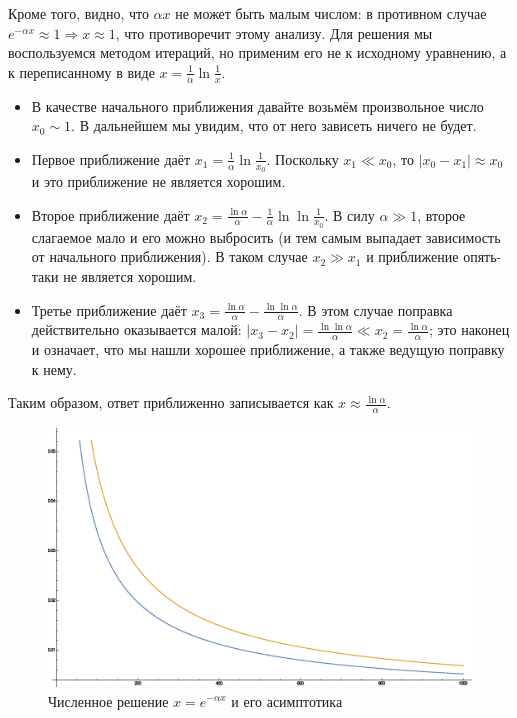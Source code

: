 \documentclass[a4paper,12pt]{article}
\begin{document}
\noindent
Кроме того, видно,
что $\alpha x$ не может быть малым числом: в противном случае $e^{-\alpha x}\approx1\Rightarrow x\approx1$,
что противоречит этому анализу. Для решения мы воспользуемся методом
итераций, но применим его не к исходному уравнению, а к переписанному
в виде $x=\frac{1}{\alpha}\ln\frac{1}{x}$. 
\begin{itemize}
	\item В качестве начального приближения давайте возьмём произвольное число
	$x_{0}\sim1$. В дальнейшем мы увидим, что от него зависеть ничего
	не будет.
	\item Первое приближение даёт $x_{1}=\frac{1}{\alpha}\ln\frac{1}{x_{0}}$.
	Поскольку $x_{1}\ll x_{0}$, то $\left|x_{0}-x_{1}\right|\approx x_{0}$
	и это приближение не является хорошим.
	\item Второе приближение даёт $x_{2}=\frac{\ln\alpha}{\alpha}-\frac{1}{\alpha}\ln\ln\frac{1}{x_{0}}$.
	В силу $\alpha\gg1$, второе слагаемое мало и его можно выбросить
	(и тем самым выпадает зависимость от начального приближения). В таком
	случае $x_{2}\gg x_{1}$ и приближение опять-таки не является хорошим.
	\item Третье приближение даёт $x_{3}=\frac{\ln\alpha}{\alpha}-\frac{\ln\ln\alpha}{\alpha}$.
	В этом случае поправка действительно оказывается малой: $\left|x_{3}-x_{2}\right|=\frac{\ln\ln\alpha}{\alpha}\ll x_{2}=\frac{\ln\alpha}{\alpha}$;
	это наконец и означает, что мы нашли хорошее приближение, а также
	ведущую поправку к нему.
\end{itemize}
Таким образом, ответ приближенно записывается как $x\approx\frac{\ln\alpha}{\alpha}$.

\begin{figure}[h]
	\caption{Численное решение $x=e^{-\alpha x}$ и его асимптотика}
	\centering
	\includegraphics[width=0.65\columnwidth]{plotexpsol.eps}
\end{figure}
\end{document}
